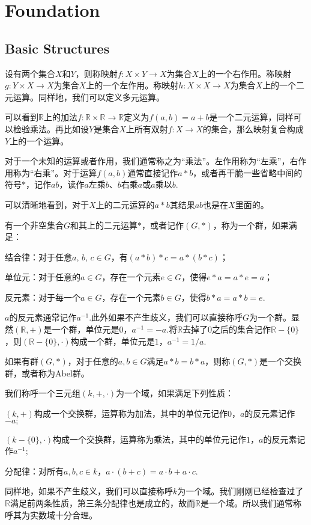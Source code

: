 \chapter{Foundation}

\section{Basic Structures}

\para 设有两个集合$X$和$Y$，则称映射$f:X\times Y \rightarrow X$为集合$X$上的一个右作用。称映射$g:Y\times X \rightarrow X$为集合$X$上的一个左作用。称映射$h:X\times X \rightarrow X$为集合$X$上的一个二元运算。同样地，我们可以定义多元运算。

可以看到$\mathbb{R}$上的加法$f:\mathbb{R}\times \mathbb{R} \rightarrow \mathbb{R}$定义为$f(a,b)=a+b$是一个二元运算，同样可以检验乘法。再比如设$Y$是集合$X$上所有双射$f:X\rightarrow X$的集合，那么映射复合构成$Y$上的一个运算。

对于一个未知的运算或者作用，我们通常称之为“乘法”。左作用称为“左乘”，右作用称为“右乘”。对于运算$f(a,b)$通常直接记作$a*b$，或者再干脆一些省略中间的符号$*$，记作$ab$，读作$a$左乘$b$、$b$右乘$a$或$a$乘以$b$.

可以清晰地看到，对于$X$上的二元运算的$a*b$其结果$ab$也是在$X$里面的。

\para 有一个非空集合$G$和其上的二元运算$*$，或者记作$(G,*)$，称为一个群，如果满足：

结合律：对于任意$a$, $b$, $c\in G$，有$(a*b)*c=a*(b*c)$；

单位元：对于任意的$a\in G$，存在一个元素$e\in G$，使得$e*a=a*e=a$；

反元素：对于每一个$a\in G$，存在一个元素$b\in G$，使得$b*a=a*b=e$.

$a$的反元素通常记作$a^{-1}$.此外如果不产生歧义，我们可以直接称呼$G$为一个群。显然$(\mathbb{R},+)$是一个群，单位元是0，$a^{-1}=-a$.将$\mathbb{R}$去掉了$0$之后的集合记作$\mathbb{R}-\{0\}$，则$(\mathbb{R}-\{0\},\cdot)$构成一个群，单位元是$1$，$a^{-1}=1/a$.

\para 如果有群$(G,*)$，对于任意的$a,b\in G$满足$a*b=b*a$，则称$(G,*)$是一个交换群，或者称为Abel群。

\para 我们称呼一个三元组$(k,+,\cdot)$为一个域，如果满足下列性质：

 $(k,+)$构成一个交换群，运算称为加法，其中的单位元记作$0$，$a$的反元素记作$-a;$

 $(k-\{0\},\cdot)$构成一个交换群，运算称为乘法，其中的单位元记作$1$，$a$的反元素记作$a^{-1};$

分配律：对所有$a,b,c \in k$，$a\cdot(b+c)=a\cdot b+a\cdot c$.

同样地，如果不产生歧义，我们可以直接称呼$k$为一个域。我们刚刚已经检查过了$\mathbb{R}$满足前两条性质，第三条分配律也是成立的，故而$\mathbb{R}$是一个域。所以我们通常称呼其为实数域十分合理。